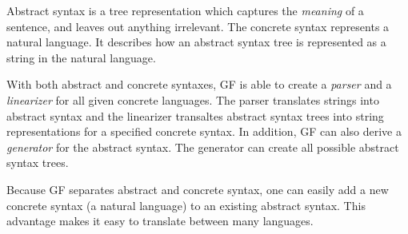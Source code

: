 Abstract syntax is a tree representation which captures the \emph{meaning} of a sentence, and leaves out anything irrelevant. The concrete syntax represents a natural language. It describes how an abstract syntax tree is represented as a string in the natural language.

With both abstract and concrete syntaxes, GF is able to create a \emph{parser} and a \emph{linearizer} for all given concrete languages. The parser translates strings into abstract syntax and the linearizer transaltes abstract syntax trees into string representations for a specified concrete syntax. In addition, GF can also derive a \emph{generator} for the abstract syntax. The generator can create all possible abstract syntax trees.

Because GF separates abstract and concrete syntax, one can easily add a new concrete syntax (a natural language) to an existing abstract syntax. This advantage makes it easy to translate between many languages.